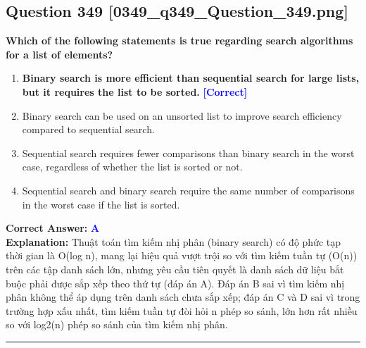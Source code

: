 \documentclass[11pt,a4paper]{article}
\begin{document}
\begin{minipage}{\textwidth}
\subsection*{Question 349 \quad \footnotesize{[0349\_q349\_Question\_349.png]}}
\noindent \textbf{Which of the following statements is true regarding search algorithms for a list of elements?}

\begin{enumerate}[label=\Alph*.]
    \item \textbf{Binary search is more efficient than sequential search for large lists, but it requires the list to be sorted.} \hfill \textcolor{blue}{\textbf{[Correct]}}
    \item Binary search can be used on an unsorted list to improve search efficiency compared to sequential search.
    \item Sequential search requires fewer comparisons than binary search in the worst case, regardless of whether the list is sorted or not.
    \item Sequential search and binary search require the same number of comparisons in the worst case if the list is sorted.
\end{enumerate}

\noindent \textbf{Correct Answer:} \textcolor{blue}{\textbf{A}} \\[2pt]
\noindent \textbf{Explanation:} Thuật toán tìm kiếm nhị phân (binary search) có độ phức tạp thời gian là O(log n), mang lại hiệu quả vượt trội so với tìm kiếm tuần tự (O(n)) trên các tập danh sách lớn, nhưng yêu cầu tiên quyết là danh sách dữ liệu bắt buộc phải được sắp xếp theo thứ tự (đáp án A). Đáp án B sai vì tìm kiếm nhị phân không thể áp dụng trên danh sách chưa sắp xếp; đáp án C và D sai vì trong trường hợp xấu nhất, tìm kiếm tuần tự đòi hỏi n phép so sánh, lớn hơn rất nhiều so với log2(n) phép so sánh của tìm kiếm nhị phân.

\par\vspace{0.3cm}
\hrule
\vspace{0.3cm}
\end{minipage}
\end{document}
